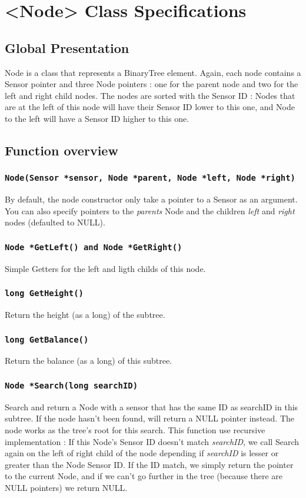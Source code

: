 \documentclass[10pt]{article}
\begin{document}
\section{<Node> Class Specifications}
\subsection{Global Presentation}
Node is a class that represents a BinaryTree element. Again, each node contains a Sensor pointer and three Node pointers : one for the parent node and two for the left and right child nodes. The nodes are sorted with the Sensor ID : Nodes that are at the left of this node will have their Sensor ID lower to this one, and Node to the left will have a Sensor ID higher to this one.

\subsection{Function overview}
\subsubsection*{\tt Node(Sensor *sensor, Node *parent, Node *left, Node *right)}
By default, the node constructor only take a pointer to a Sensor as an argument. You can also specify pointers to the \emph{parents} Node and the children \emph{left} and \emph{right} nodes (defaulted to NULL).
\subsubsection*{\tt Node *GetLeft()  and Node *GetRight() }
Simple Getters for the left and ligth childs of this node.

\subsubsection*{\tt long GetHeight()}
Return the height (as a long) of the subtree.

\subsubsection*{\tt long GetBalance()}
Return the balance (as a long) of this subtree.

\subsubsection*{\tt Node *Search(long searchID)}
Search and return a Node with a sensor that has the same ID as searchID in this subtree. If the node hasn't been found, will return a NULL pointer instead.
The node works as the tree's root for this search. This function use recursive implementation : If this Node's Sensor ID doesn't match \emph{searchID}, we call Search again on the left of right child of the node depending if \emph{searchID} is lesser or greater than the Node Sensor ID. If the ID match, we simply return the pointer to the current Node, and if we can't go further in the tree (because there are NULL pointers) we return NULL. 
\end{document}
